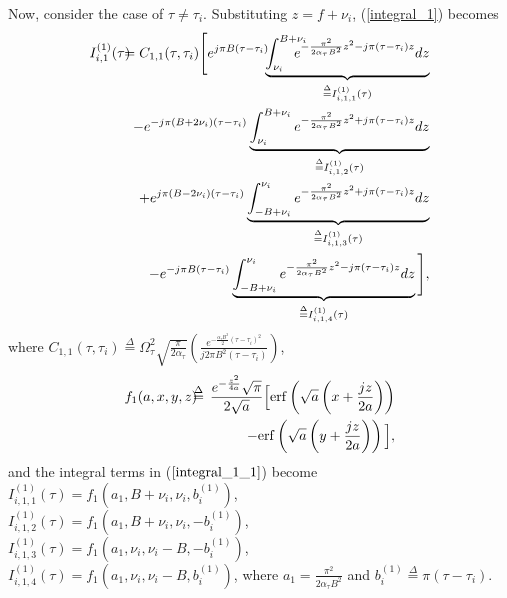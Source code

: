 Now, consider the case of $\tau \neq \tau_i$.
Substituting $z=f+\nu_{i}$, (\ref{integral_1}) becomes
\begin{eqnarray}
I_{i,1}^{(1)}(\tau) & \hspace{-2.5mm} = & \hspace{-2.5mm} C_{1,1}(\tau,\tau_i)\Bigg[e^{j\pi B(\tau-\tau_{i})}\hspace{-1.5mm}\underbrace{\int_{\nu_{i}}^{B+\nu_{i}}\hspace{-4mm}e^{-\frac{\pi^{2}}{2\alpha_{\tau}B^{2}}z^{2}-j\pi(\tau-\tau_i) z}dz}_{\overset{\Delta}{=}I_{i,1,1}^{(1)}(\tau)} \nonumber \\
& \hspace{-15mm} & \hspace{-10mm} 
-e^{-j\pi (B+2\nu_{i})(\tau-\tau_{i})}\underbrace{\int_{\nu_{i}}^{B+\nu_{i}}e^{-\frac{\pi^{2}}{2\alpha_{\tau}B^{2}}z^{2}+j\pi (\tau-\tau_i)z}dz}_{\overset{\Delta}{=}I_{i,1,2}^{(1)}(\tau)} \nonumber \\
& \hspace{-15mm} & \hspace{-10mm} 
+e^{j\pi (B-2\nu_{i})(\tau-\tau_{i})}\underbrace{\int_{-B+\nu_{i}}^{\nu_{i}}e^{-\frac{\pi^{2}}{2\alpha_{\tau}B^{2}}z^{2}+j\pi (\tau-\tau_i)z}dz}_{\overset{\Delta}{=}I_{i,1,3}^{(1)}(\tau)} \nonumber \\
& \hspace{-15mm} & \hspace{-10mm} -e^{-j\pi B(\tau-\tau_{i})}\underbrace{\int_{-B+\nu_{i}}^{\nu_{i}}e^{-\frac{\pi^{2}}{2\alpha_{\tau}B^{2}}z^{2}-j\pi (\tau-\tau_i)z}dz}_{\overset{\Delta}{=}I_{i,1,4}^{(1)}(\tau)}\Bigg], 
\label{integral_1_1}
\end{eqnarray}
where $C_{1,1}(\tau,\tau_i)\overset{\Delta}{=}\Omega_{\tau}^{2}\sqrt{\frac{\pi}{2\alpha_{\tau}}}\left(\frac{e^{-\frac{\alpha_{\tau}B^{2}}{2}(\tau-\tau_i)^{2}}}{j2\pi B^{2}(\tau-\tau_i)}\right)$, 
\begin{eqnarray}
f_{1}(a,x,y,z) & \hspace{-2mm}  \overset{\Delta}{=} & \hspace{-2mm}
\frac{e^{-\frac{z^{2}}{4a}}\sqrt{\pi}}{2\sqrt{a}} \Big[\mathrm{erf}\left(\sqrt{a}\left(x+\frac{jz}{2a}\right)\right) \nonumber \\
& \hspace{-2mm} & \hspace{-2mm} 
-\mathrm{erf}\left(\sqrt{a}\left(y+\frac{jz}{2a}\right)\right)\Big], 
\label{f_1}
\end{eqnarray}
and the integral terms in ($\ref{integral_1_1}$) become \\
$I_{i,1,1}^{(1)}(\tau)= f_{1}\left(a_1,B+\nu_i,\nu_i,b_i^{(1)}\right)$, \\
$I_{i,1,2}^{(1)}(\tau)= f_{1}\left(a_1,B+\nu_i,\nu_i,-b_i^{(1)}\right)$, \\
$I_{i,1,3}^{(1)}(\tau) = f_{1}\left(a_1,\nu_i,\nu_i-B,-b_i^{(1)}\right)$, \\
$I_{i,1,4}^{(1)}(\tau) = f_{1}\left(a_1,\nu_i,\nu_i-B,b_i^{(1)}\right)$,
where $a_1=\frac{\pi^{2}}{2\alpha_{\tau}B^{2}}$ and 
$b_{i}^{(1)}\overset{\Delta}{=}\pi(\tau-\tau_i)$. 

